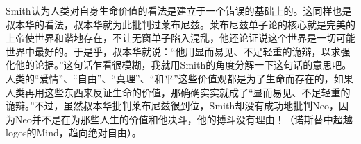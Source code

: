 \documentclass[UTF8]{ctexart}
\begin{document}
Smith认为人类对自身生命价值的看法是建立于一个错误的基础上的。这同样也是叔本华的看法，叔本华就为此批判过莱布尼兹。莱布尼兹单子论的核心就是完美的上帝使世界和谐地存在，不让无窗单子陷入混乱，他还论证说这个世界是一切可能世界中最好的。于是乎，叔本华就说：“他用显而易见、不足轻重的诡辩，以求强化他的论据。”这句话乍看很模糊，我就用Smith的角度分解一下这句话的意思吧。人类的“爱情”、“自由”、“真理”、“和平”这些价值观都是为了生命而存在的，如果人类再用这些东西来反证生命的价值，那确确实实就成了“显而易见、不足轻重的诡辩。”不过，虽然叔本华批判莱布尼兹很到位，Smith却没有成功地批判Neo，因为Neo并不是在为那些人生的价值和他决斗，他的搏斗没有理由！（诺斯替中超越logos的Mind，趋向绝对自由）。
\end{document}
